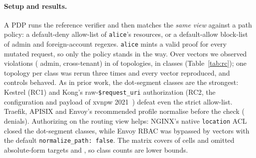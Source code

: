 \paragraph{Setup and results.} A PDP runs the reference verifier and then
matches the \emph{same view} against a path policy: a default-deny allow-list
of \texttt{alice}'s resources, or a default-allow block-list of admin and
foreign-account regexes. \texttt{alice} mints a valid proof for every mutated
request, so only the policy stands in the way. Over \NumEFourVectors{} vectors
we observed \NumEFourViolations{} violations (\NumEFourAdmin{} admin,
\NumEFourBob{} cross-tenant) in \NumEFourVulnTopologies{} of
\NumEFourTopologies{} topologies, in \NumEFourClasses{} classes
(Table~\ref{tab:rc}); one topology per class was rerun three times and every
vector reproduced, and controls behaved. As in prior work, the dot-segment
classes are the strongest: Kestrel (RC1) and Kong's raw-\texttt{\$request\_uri}
authorization (RC2, the configuration and payload of xvnpw
2021~\cite{p2:xvnpw2021kong}) defeat even the strict allow-list. Traefik,
APISIX and Envoy's recommended profile normalise before the check
(\NumEFourHtuMismatch{} \htu denials). Authorizing on the routing view helps:
NGINX's native \texttt{location} ACL closed the dot-segment classes, while
Envoy RBAC was bypassed by \NumNativeEnvoyRaw{} vectors with the default
\texttt{normalize\_path: false}. The matrix covers \NumEFourTopologies{} of
\NumEFourCells{} cells and omitted absolute-form targets and
, so class counts are lower bounds.
